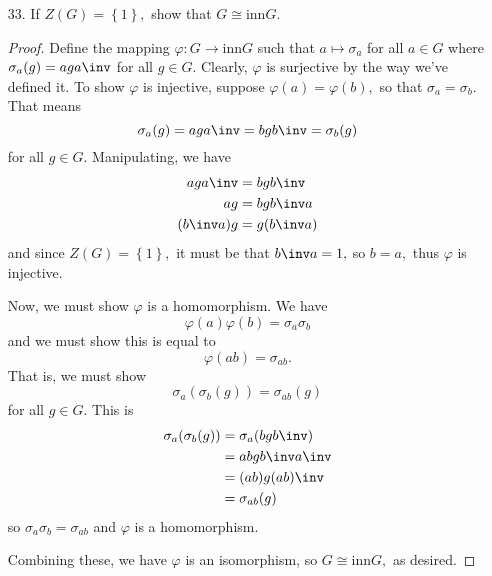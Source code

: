 \documentclass{article}
\begin{document}
\begin{itemize}
\begin{proof}
		\end{proof}

	\item[33.] If $Z(G)=\left\{ 1 \right\},$ show that $G\cong\text{inn}G.$
		\begin{proof}
			Define the mapping $\varphi:G\to\text{inn}G$ such that $a\mapsto \sigma_a$ for all $a\in G$ where $\sigma_a(g)=aga\inv$ for all $g\in G.$ Clearly, $\varphi$ is surjective by the way we've defined it. To show $\varphi$ is injective, suppose $\varphi(a)=\varphi(b),$ so that $\sigma_a=\sigma_b.$ That means \[\sigma_a(g)=aga\inv=bgb\inv=\sigma_b(g)\] for all $g\in G.$ Manipulating, we have 
			\begin{align*}
				aga\inv &= bgb\inv \\
				ag &= bgb\inv a\\
				(b\inv a)g &= g(b\inv a) \\
			\end{align*} and since $Z(G)=\left\{ 1 \right\},$ it must be that $b\inv a=1,$ so $b=a,$ thus $\varphi$ is injective.

			Now, we must show $\varphi$ is a homomorphism. We have \[\varphi(a)\varphi(b)=\sigma_a\sigma_b\] and we must show this is equal to \[\varphi(ab)=\sigma_{ab}.\] That is, we must show \[\sigma_a(\sigma_b(g))=\sigma_{ab}(g)\] for all $g\in G.$ This is
			\begin{align*}
				\sigma_a(\sigma_b(g))&=\sigma_a(bgb\inv) \\
				&= abgb\inv a\inv \\
				&= (ab)g(ab)\inv \\
				&= \sigma_{ab}(g)
			\end{align*} so $\sigma_a\sigma_b=\sigma_{ab}$ and $\varphi$ is a homomorphism.

			Combining these, we have $\varphi$ is an isomorphism, so $G\cong \text{inn}G,$ as desired.

		\end{proof}

\end{itemize}
\end{document}
